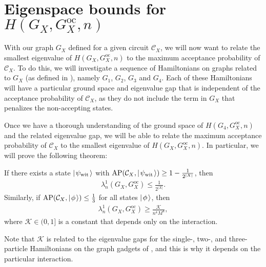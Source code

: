 \documentclass[../thesis-main/thesis-main]{subfiles}
\begin{document}

\section{Eigenspace bounds for $H(G_X,G_X^{\text{oc}},n)$}\label{sec:g_x_proof}

With our graph $G_X$ defined for a given circuit $\mathcal{C}_X$, we will now want to relate the smallest eigenvalue of $H(G_X,G_X^{\text{oc}},n)$ to the maximum acceptance probability of $\mathcal{C}_X$.  To do this, we will investigate a sequence of Hamiltonians on graphs related to $G_X$ (as defined in ), namely $G_1$,  $G_2$, $G_3$ and $G_4$.  Each of these Hamiltonians will have a particular ground space and eigenvalue gap that is independent of the acceptance probability of $\mathcal{C}_X$, as they do not include the term in $G_X$ that penalizes the non-accepting states.

Once we have a thorough understanding of the ground space of $H(G_4,G_X^{\text{oc}},n)$ and the related eigenvalue gap, we will be able to relate the maximum acceptance probability of $\mathcal{C}_X$ to the smallest eigenvalue of $H(G_X,G_X^{\text{oc}},n)$.  In particular, we will prove the following theorem:

\begin{theorem}\label{thm:g_x_with_oc_to_acceptance} If there exists a state $|\mspace{2mu} \psi_{\text{wit}} \mspace{2mu} \rangle$ with $\operatorname{AP}(\mathcal{C}_X,|\mspace{2mu} \psi_{\text{wit}} \mspace{2mu} \rangle) \geq 1- \frac{1}{2^{|X|}}$, then 
\begin{align}
  \lambda_n^1(G_X,G_X^{\text{oc}}) \leq \frac{1}{2^{|X|}}.\label{eq:cond1}
\end{align}
Similarly, if $\operatorname{AP}(\mathcal{C}_X,|\mspace{2mu} \phi \mspace{2mu} \rangle) \leq \frac{1}{3}$ for all states $|\mspace{2mu} \phi \mspace{2mu} \rangle$, then
\begin{align}
  \lambda_n^{1}(G_X,G_X^{\text{oc}}) \geq \frac{ \mathcal{K}}{n^4 M^4},\label{eq:cond2}
\end{align}
where $\mathcal{K}\in (0,1]$ is a constant that depends only on the interaction.
\end{theorem}

Note that $\mathcal{K}$ is related to the eigenvalue gaps for the single-, two-, and three-particle Hamiltonians on the graph gadgets of , and this is why it depends on the particular interaction.
\end{document}
